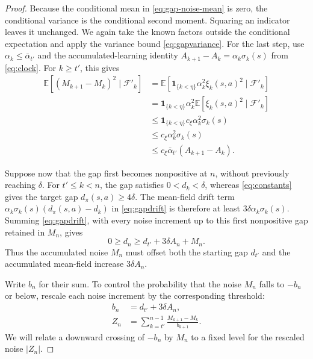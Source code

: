 \begin{proof}
Because the conditional mean in \eqref{eq:gap-noise-mean} is zero, the conditional variance is the conditional second moment. Squaring an indicator leaves it unchanged. We again take the known factors outside the conditional expectation and apply the variance bound \eqref{eq:gapvariance}. For the last step, use $\alpha_k\le\bar\alpha_{t'}$ and the accumulated-learning identity $A_{k+1}-A_k=\alpha_k\sigma_k(s)$ from \eqref{eq:clock}. For $k\ge t'$, this gives
\begin{equation}
\begin{aligned}
\mathbb E[(M_{k+1}-M_k)^2\mid\mathcal F'_k]
&=\mathbb E[\mathbf1_{\{k<\eta\}}\alpha_k^2\xi_k(s,a)^2
\mid\mathcal F'_k]\\
&=\mathbf1_{\{k<\eta\}}\alpha_k^2
\mathbb E[\xi_k(s,a)^2\mid\mathcal F'_k]\\
&\le\mathbf1_{\{k<\eta\}}c_\xi\alpha_k^2\sigma_k(s)\\
&\le c_\xi\alpha_k^2\sigma_k(s)\\
&\le c_\xi\bar\alpha_{t'}(A_{k+1}-A_k).
\end{aligned}
\label{eq:gap-noise-second-moment}
\end{equation}

Suppose now that the gap first becomes nonpositive at $n$, without previously reaching $\delta$. For $t'\le k<n$, the gap satisfies $0<d_k<\delta$, whereas \eqref{eq:constants} gives the target gap $d_\pi(s,a)\ge4\delta$. The mean-field drift term $\alpha_k\sigma_k(s)(d_\pi(s,a)-d_k)$ in \eqref{eq:gapdrift} is therefore at least $3\delta\alpha_k\sigma_k(s)$. Summing \eqref{eq:gapdrift}, with every noise increment up to this first nonpositive gap retained in $M_n$, gives
\begin{equation}
0\ge d_n\ge d_{t'}+3\delta A_n+M_n.
\label{eq:gap-before-noise}
\end{equation}
Thus the accumulated noise $M_n$ must offset both the starting gap $d_{t'}$ and the accumulated mean-field increase $3\delta A_n$.

Write $b_n$ for their sum. To control the probability that the noise $M_n$ falls to $-b_n$ or below, rescale each noise increment by the corresponding threshold:
\begin{equation}
\begin{aligned}
b_n&=d_{t'}+3\delta A_n,\\
Z_n&=\sum_{k=t'}^{n-1}\frac{M_{k+1}-M_k}{b_{k+1}}.
\end{aligned}
\label{eq:gap-rescaling}
\end{equation}
We will relate a downward crossing of $-b_n$ by $M_n$ to a fixed level for the rescaled noise $|Z_n|$.


\end{proof}

